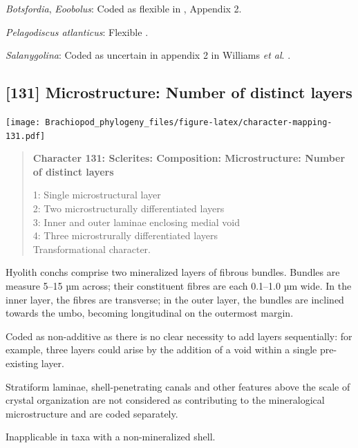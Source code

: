 \documentclass[openany]{book}
\begin{document}
\hypertarget{Botsfordia-coding-130}{}
\emph{Botsfordia}, \emph{Eoobolus}: Coded as flexible in
\citet{Williams1998Thediversity}, Appendix 2.

\hypertarget{Pelagodiscus_atlanticus-coding-130}{}
\emph{Pelagodiscus atlanticus}: Flexible
\citep{Williams1998Thediversity}.

\hypertarget{Salanygolina-coding-130}{}
\emph{Salanygolina}: Coded as uncertain in appendix 2 in Williams
\emph{et al}. \citeyearpar{Williams1998Thediversity}.

\subsection*{{[}131{]} Microstructure: Number of distinct
layers}\label{microstructure-number-of-distinct-layers}

\texttt{[image: Brachiopod\_phylogeny\_files/figure-latex/character-mapping-131.pdf]}

\begin{quote}
\textbf{Character 131: Sclerites: Composition: Microstructure: Number of
distinct layers}

1: Single microstructural layer\\
2: Two microstructurally differentiated layers\\
3: Inner and outer laminae enclosing medial void\\
4: Three microstrurally differentiated layers\\
Transformational character.
\end{quote}

Hyolith conchs comprise two mineralized layers of fibrous bundles.
Bundles are measure 5--15 µm across; their constituent fibres are each
0.1--1.0 µm wide. In the inner layer, the fibres are transverse; in the
outer layer, the bundles are inclined towards the umbo, becoming
longitudinal on the outermost margin.

Coded as non-additive as there is no clear necessity to add layers
sequentially: for example, three layers could arise by the addition of a
void within a single pre-existing layer.

Stratiform laminae, shell-penetrating canals and other features above
the scale of crystal organization are not considered as contributing to
the mineralogical microstructure and are coded separately.

Inapplicable in taxa with a non-mineralized shell.
\end{document}

